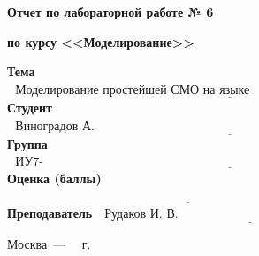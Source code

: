 \begin{titlepage}
	
	\begin{center}
		\Large\textbf{Отчет по лабораторной работе № 6}
		
		\Large\textbf{по курсу <<Моделирование>>}
		
		\textbf{\newline}		
	\end{center}
	
	\noindent\textbf{Тема} $\underline{\text{~~Моделирование простейшей СМО на языке GPSS~~~~~~~~~~~~~~~~~~~~~~~~~~~~~~~~~~~~~~~~~~~~~~~~~~~~~~~~~~~~~~~~~~~~~~~~}}$\newline\newline
	\noindent\textbf{Студент} $\underline{\text{~~Виноградов А. О.~~~~~~~~~~~~~~~~~~~~~~~~~~~~~~~~~~~~~~~~~~~~~~~~~~~~~~~~~~~~~~~~~~~~~~~~~~~~~~~~~~~~~~}}$\newline\newline
	\noindent\textbf{Группа} $\underline{\text{~~ИУ7-76Б~~~~~~~~~~~~~~~~~~~~~~~~~~~~~~~~~~~~~~~~~~~~~~~~~~~~~~~~~~~~~~~~~~~~~~~~~~~~~~~~~~~~~~~~~~~~~~~~~~~~}}$\newline\newline
	\noindent\textbf{Оценка (баллы)} $\underline{\textbf{~~~~~~~~~~~~~~~~~~~~~~~~~~~~~~~~~~~~~~~~~~~~~~~~~~~~~~~~~~~~~~~~~~~~~~~~~~~~~~~~~~~~~~~~}}$\newline\newline
	\noindent\textbf{Преподаватель} $\underline{\text{~~Рудаков И. В.~~~~~~~~~~~~~~~~~~~~~~~~~~~~~~~~~~~~~~~~~~~~~~~~~~~~~~~}}$\newline
	
	\begin{center}
		\vfill
		Москва~---~\the\year
		~г.
	\end{center}
	\restoregeometry
	
\end{titlepage}